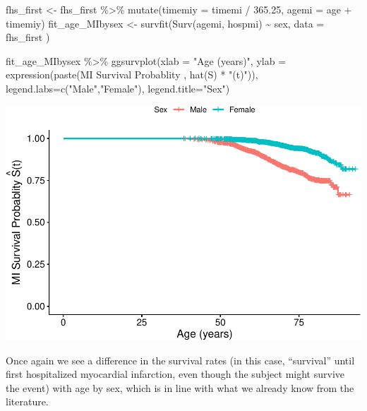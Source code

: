 \documentclass[
]{book}
\newenvironment{Shaded}{\begin{snugshade}}{\end{snugshade}}
\newcommand{\AttributeTok}[1]{\textcolor[rgb]{0.77,0.63,0.00}{#1}}
\newcommand{\FloatTok}[1]{\textcolor[rgb]{0.00,0.00,0.81}{#1}}
\newcommand{\FunctionTok}[1]{\textcolor[rgb]{0.00,0.00,0.00}{#1}}
\newcommand{\NormalTok}[1]{#1}
\newcommand{\OtherTok}[1]{\textcolor[rgb]{0.56,0.35,0.01}{#1}}
\newcommand{\SpecialCharTok}[1]{\textcolor[rgb]{0.00,0.00,0.00}{#1}}
\newcommand{\StringTok}[1]{\textcolor[rgb]{0.31,0.60,0.02}{#1}}
\begin{document}
\begin{Shaded}
\begin{Highlighting}[]
\NormalTok{fhs\_first }\OtherTok{\textless{}{-}}\NormalTok{ fhs\_first }\SpecialCharTok{\%\textgreater{}\%} 
  \FunctionTok{mutate}\NormalTok{(}\AttributeTok{timemiy =}\NormalTok{ timemi }\SpecialCharTok{/} \FloatTok{365.25}\NormalTok{, }
         \AttributeTok{agemi =}\NormalTok{ age }\SpecialCharTok{+}\NormalTok{ timemiy) }
\NormalTok{fit\_age\_MIbysex }\OtherTok{\textless{}{-}} \FunctionTok{survfit}\NormalTok{(}\FunctionTok{Surv}\NormalTok{(agemi, hospmi) }\SpecialCharTok{\textasciitilde{}}\NormalTok{ sex, }\AttributeTok{data =}\NormalTok{ fhs\_first )}

\NormalTok{fit\_age\_MIbysex }\SpecialCharTok{\%\textgreater{}\%}
  \FunctionTok{ggsurvplot}\NormalTok{(}\AttributeTok{xlab =} \StringTok{"Age (years)"}\NormalTok{,}
             \AttributeTok{ylab =} \FunctionTok{expression}\NormalTok{(}\FunctionTok{paste}\NormalTok{(}\StringTok{\textquotesingle{}MI Survival Probablity \textquotesingle{}}\NormalTok{, }
                                     \FunctionTok{hat}\NormalTok{(S) }\SpecialCharTok{*} \StringTok{"(t)"}\NormalTok{)),}
             \AttributeTok{legend.labs=}\FunctionTok{c}\NormalTok{(}\StringTok{"Male"}\NormalTok{,}\StringTok{"Female"}\NormalTok{),}
             \AttributeTok{legend.title=}\StringTok{"Sex"}\NormalTok{)}
\end{Highlighting}
\end{Shaded}

\includegraphics{adv_epi_analysis_files/figure-latex/unnamed-chunk-204-1.pdf}

Once again we see a difference in the survival rates (in this case, ``survival'' until first hospitalized myocardial infarction, even though the subject might survive the event) with age by sex, which is in line with what we already know from the literature.
\end{document}
